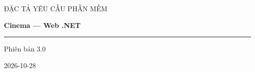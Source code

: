 \documentclass[11pt,a4paper,oneside]{article}
\begin{document}
\begin{titlepage}
\centering
\vspace*{32mm}
{\Large\sffamily\color{SRSlate}ĐẶC TẢ YÊU CẦU PHẦN MỀM\par}
\vspace{14mm}
{\Huge\bfseries\color{SRSlate}Cinema — Web .NET\par}
\vspace{12mm}
{\color{SRSRule}\rule{.72\textwidth}{.7pt}\par}
\vfill
{\large Phiên bản 3.0\par}
\vspace{4mm}
{\large 2026-10-28\par}
\vspace{20mm}
\end{titlepage}


\clearpage
\tableofcontents
\clearpage
\listoftables
\clearpage
{}




























\end{document}
